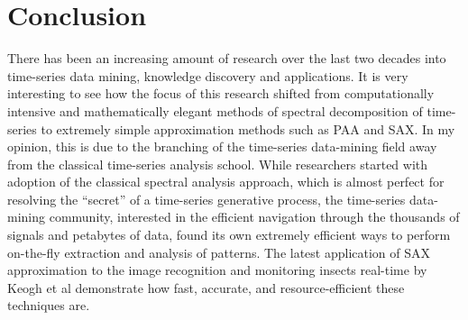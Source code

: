 \chapter{Conclusion}
There has been an increasing amount of research over the last two decades into time-series data mining, knowledge discovery and applications. It is very interesting to see how the focus of this research shifted from computationally intensive and mathematically elegant methods of spectral decomposition of time-series to extremely simple approximation methods such as PAA and SAX. In my opinion, this is due to the branching of the time-series data-mining field away from the classical time-series analysis school. While researchers started with adoption of the classical spectral analysis approach, which is almost perfect for resolving the ``secret'' of a time-series generative process, the time-series data-mining community, interested in the efficient navigation through the thousands of signals and petabytes of data, found its own extremely efficient ways to perform on-the-fly extraction and analysis of patterns. The latest application of SAX approximation to the image recognition \cite{citeulike:3175770} and monitoring insects real-time \cite{citeulike:4446167} by Keogh et al demonstrate how fast, accurate, and resource-efficient these techniques are. 